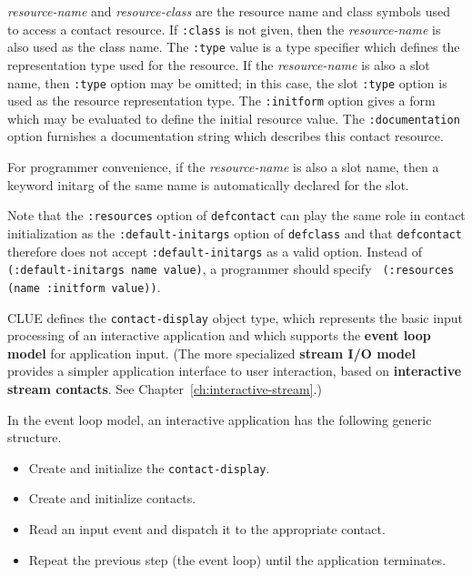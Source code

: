 \documentclass[twoside]{book}
\begin{document}
\begin{sloppy}
{\em resource-name} and {\em resource-class} are the resource name and class
symbols used to access a contact resource. 
If {\tt :class} is not given, then
the {\em resource-name} is also used as the class name.
The {\tt :type} value is a type specifier which defines the representation type
used for the resource.
If the {\em resource-name} is also a slot name, then {\tt :type} option may
be omitted; in this case,
the slot {\tt :type} option is used as the resource representation type.
The {\tt :initform} option gives a form which may be evaluated to define the
initial resource value. The {\tt :documentation} option furnishes a
documentation string which describes this contact resource.

For programmer convenience, if the {\em resource-name} is also a slot name, then
a keyword initarg of the same name is automatically declared for the
slot.


Note that the {\tt :resources} option of {\tt defcontact} can play the
same role in contact initialization as the {\tt :default-initargs}
option of {\tt defclass} and that {\tt defcontact} therefore does not
accept {\tt :default-initargs} as a valid option. Instead of {\tt
(:default-initargs name value)}, a programmer should specify {\tt
(:resources (name :initform value))}.




CLUE defines the {\tt contact-display} object type, which represents the
basic input processing of an interactive application and which supports the {\bf
event loop model} for application input. (The
more specialized 
{\bf stream I/O model} provides a simpler application
interface to user interaction, based on {\bf interactive stream
contacts}. See
Chapter~\ref{ch:interactive-stream}.)

In the event loop model, an interactive application has the following generic
structure.  
\begin{itemize}
\item Create and initialize the {\tt contact-display}.
\item Create and initialize contacts.
\item Read an input event and dispatch it to the appropriate contact. 
\item Repeat the previous step (the event loop) until the application terminates.
\end{itemize}


\end{sloppy}
\end{document}
